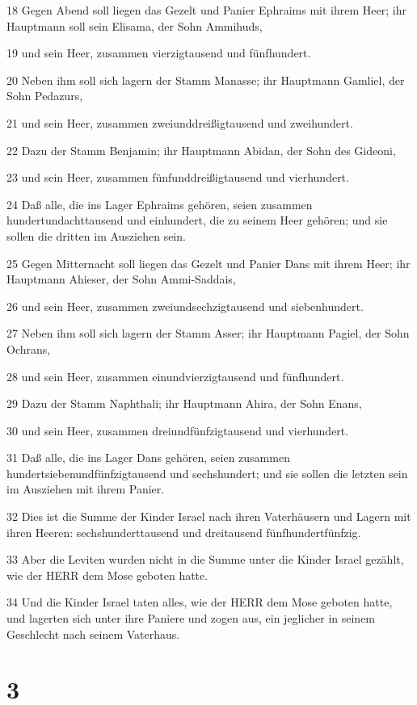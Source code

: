 \par 18 Gegen Abend soll liegen das Gezelt und Panier Ephraims mit ihrem Heer; ihr Hauptmann soll sein Elisama, der Sohn Ammihuds,
\par 19 und sein Heer, zusammen vierzigtausend und fünfhundert.
\par 20 Neben ihm soll sich lagern der Stamm Manasse; ihr Hauptmann Gamliel, der Sohn Pedazurs,
\par 21 und sein Heer, zusammen zweiunddreißigtausend und zweihundert.
\par 22 Dazu der Stamm Benjamin; ihr Hauptmann Abidan, der Sohn des Gideoni,
\par 23 und sein Heer, zusammen fünfunddreißigtausend und vierhundert.
\par 24 Daß alle, die ins Lager Ephraims gehören, seien zusammen hundertundachttausend und einhundert, die zu seinem Heer gehören; und sie sollen die dritten im Ausziehen sein.
\par 25 Gegen Mitternacht soll liegen das Gezelt und Panier Dans mit ihrem Heer; ihr Hauptmann Ahieser, der Sohn Ammi-Saddais,
\par 26 und sein Heer, zusammen zweiundsechzigtausend und siebenhundert.
\par 27 Neben ihm soll sich lagern der Stamm Asser; ihr Hauptmann Pagiel, der Sohn Ochrans,
\par 28 und sein Heer, zusammen einundvierzigtausend und fünfhundert.
\par 29 Dazu der Stamm Naphthali; ihr Hauptmann Ahira, der Sohn Enans,
\par 30 und sein Heer, zusammen dreiundfünfzigtausend und vierhundert.
\par 31 Daß alle, die ins Lager Dans gehören, seien zusammen hundertsiebenundfünfzigtausend und sechshundert; und sie sollen die letzten sein im Ausziehen mit ihrem Panier.
\par 32 Dies ist die Summe der Kinder Israel nach ihren Vaterhäusern und Lagern mit ihren Heeren: sechshunderttausend und dreitausend fünfhundertfünfzig.
\par 33 Aber die Leviten wurden nicht in die Summe unter die Kinder Israel gezählt, wie der HERR dem Mose geboten hatte.
\par 34 Und die Kinder Israel taten alles, wie der HERR dem Mose geboten hatte, und lagerten sich unter ihre Paniere und zogen aus, ein jeglicher in seinem Geschlecht nach seinem Vaterhaus.

\chapter{3}

